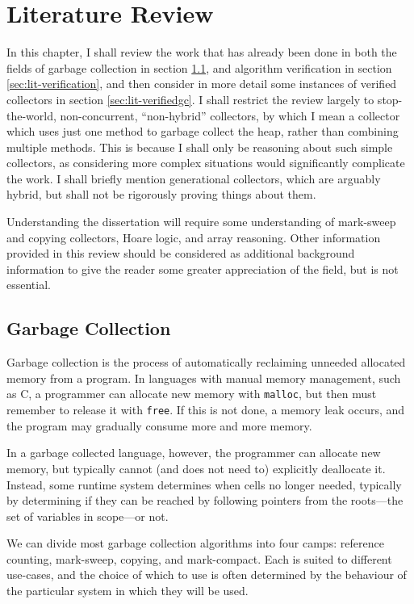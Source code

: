 \chapter{Literature Review}
\label{sec:lit}

In this chapter, I shall review the work that has already been done in
both the fields of garbage collection in section \ref{sec:lit-gc}, and
algorithm verification in section \ref{sec:lit-verification}, and then
consider in more detail some instances of verified collectors in
section \ref{sec:lit-verifiedgc}. I shall restrict the review largely
to stop-the-world, non-concurrent, ``non-hybrid'' collectors, by which
I mean a collector which uses just one method to garbage collect the
heap, rather than combining multiple methods. This is because I shall
only be reasoning about such simple collectors, as considering more
complex situations would significantly complicate the work. I shall
briefly mention generational collectors, which are arguably hybrid,
but shall not be rigorously proving things about them.

Understanding the dissertation will require some understanding of
mark-sweep and copying collectors, Hoare logic, and array
reasoning. Other information provided in this review should be
considered as additional background information to give the reader
some greater appreciation of the field, but is not essential.

\section{Garbage Collection}
\label{sec:lit-gc}

Garbage collection is the process of automatically reclaiming unneeded
allocated memory from a program\cite{McCarthy60}. In languages with
manual memory management, such as C, a programmer can allocate new
memory with \texttt{malloc}, but then must remember to release it with
\texttt{free}.\cite{KandR} If this is not done, a memory leak occurs,
and the program may gradually consume more and more
memory\cite{Barach82}.

In a garbage collected language, however, the programmer can allocate
new memory, but typically cannot (and does not need to) explicitly
deallocate it. Instead, some runtime system determines when cells no
longer needed, typically by determining if they can be reached by
following pointers from the roots---the set of variables in scope---or
not.

We can divide most garbage collection algorithms into four camps:
reference counting, mark-sweep, copying, and
mark-compact\cite{GarbageCollection}. Each is suited to different
use-cases, and the choice of which to use is often determined by the
behaviour of the particular system in which they will be used.

